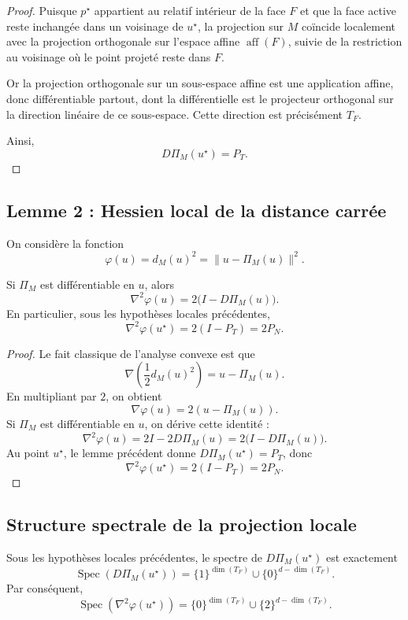 \begin{proof}
Puisque $p^\star$ appartient au relatif intérieur de la face $F$ et que la face active reste inchangée dans un voisinage de $u^\star$, la projection sur $M$ coïncide localement avec la projection orthogonale sur l'espace affine $\operatorname{aff}(F)$, suivie de la restriction au voisinage où le point projeté reste dans $F$.

Or la projection orthogonale sur un sous-espace affine est une application affine, donc différentiable partout, dont la différentielle est le projecteur orthogonal sur la direction linéaire de ce sous-espace. Cette direction est précisément $T_F$.

Ainsi,
\[
D\Pi_M(u^\star)=P_T.
\]
\end{proof}

\subsection{Lemme 2 : Hessien local de la distance carrée}

On considère la fonction
\[
\varphi(u)=d_M(u)^2=\|u-\Pi_M(u)\|^2.
\]

\begin{lemma}
Si $\Pi_M$ est différentiable en $u$, alors
\[
\nabla^2 \varphi(u)=2\bigl(I-D\Pi_M(u)\bigr).
\]
En particulier, sous les hypothèses locales précédentes,
\[
\nabla^2 \varphi(u^\star)=2(I-P_T)=2P_N.
\]
\end{lemma}

\begin{proof}
Le fait classique de l'analyse convexe est que
\[
\nabla\!\left(\frac12 d_M(u)^2\right)=u-\Pi_M(u).
\]
En multipliant par $2$, on obtient
\[
\nabla \varphi(u)=2(u-\Pi_M(u)).
\]
Si $\Pi_M$ est différentiable en $u$, on dérive cette identité :
\[
\nabla^2\varphi(u)=2I-2D\Pi_M(u)=2\bigl(I-D\Pi_M(u)\bigr).
\]
Au point $u^\star$, le lemme précédent donne $D\Pi_M(u^\star)=P_T$, donc
\[
\nabla^2\varphi(u^\star)=2(I-P_T)=2P_N.
\]
\end{proof}

\subsection{Structure spectrale de la projection locale}

\begin{proposition}
Sous les hypothèses locales précédentes, le spectre de $D\Pi_M(u^\star)$ est exactement
\[
\operatorname{Spec}(D\Pi_M(u^\star))
=
\{1\}^{\dim(T_F)}\cup \{0\}^{d-\dim(T_F)}.
\]
Par conséquent,
\[
\operatorname{Spec}(\nabla^2\varphi(u^\star))
=
\{0\}^{\dim(T_F)}\cup \{2\}^{d-\dim(T_F)}.
\]
\end{proposition}

